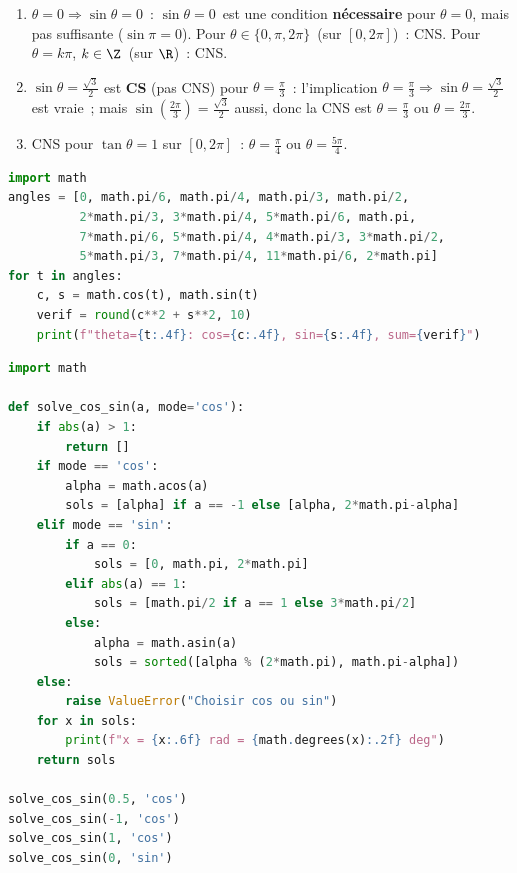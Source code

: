 \begin{enumerate}
  \item $\theta=0\Rightarrow\sin\theta=0$~: \og $\sin\theta=0$\fg\ est une condition \textbf{n\'ecessaire} pour $\theta=0$, mais pas suffisante ($\sin\pi=0$).
        Pour \og $\theta\in\{0,\pi,2\pi\}$\fg\ (sur $[0,2\pi]$)~: CNS. Pour \og $\theta=k\pi$, $k\in\Z$\fg\ (sur $\R$)~: CNS.
  \item $\sin\theta=\frac{\sqrt{3}}{2}$ est \textbf{CS} (pas CNS) pour $\theta=\frac{\pi}{3}$~:
        l'implication $\theta=\frac{\pi}{3}\Rightarrow\sin\theta=\frac{\sqrt{3}}{2}$ est vraie~;
        mais $\sin(\frac{2\pi}{3})=\frac{\sqrt{3}}{2}$ aussi, donc la CNS est $\theta=\frac{\pi}{3}$ ou $\theta=\frac{2\pi}{3}$.
  \item CNS pour $\tan\theta=1$ sur $[0,2\pi]$~: $\theta=\frac{\pi}{4}$ ou $\theta=\frac{5\pi}{4}$.
\end{enumerate}


\begin{lstlisting}[language=Python]
import math
angles = [0, math.pi/6, math.pi/4, math.pi/3, math.pi/2,
          2*math.pi/3, 3*math.pi/4, 5*math.pi/6, math.pi,
          7*math.pi/6, 5*math.pi/4, 4*math.pi/3, 3*math.pi/2,
          5*math.pi/3, 7*math.pi/4, 11*math.pi/6, 2*math.pi]
for t in angles:
    c, s = math.cos(t), math.sin(t)
    verif = round(c**2 + s**2, 10)
    print(f"theta={t:.4f}: cos={c:.4f}, sin={s:.4f}, sum={verif}")
\end{lstlisting}


\begin{lstlisting}[language=Python]
import math

def solve_cos_sin(a, mode='cos'):
    if abs(a) > 1:
        return []
    if mode == 'cos':
        alpha = math.acos(a)
        sols = [alpha] if a == -1 else [alpha, 2*math.pi-alpha]
    elif mode == 'sin':
        if a == 0:
            sols = [0, math.pi, 2*math.pi]
        elif abs(a) == 1:
            sols = [math.pi/2 if a == 1 else 3*math.pi/2]
        else:
            alpha = math.asin(a)
            sols = sorted([alpha % (2*math.pi), math.pi-alpha])
    else:
        raise ValueError("Choisir cos ou sin")
    for x in sols:
        print(f"x = {x:.6f} rad = {math.degrees(x):.2f} deg")
    return sols

solve_cos_sin(0.5, 'cos')
solve_cos_sin(-1, 'cos')
solve_cos_sin(1, 'cos')
solve_cos_sin(0, 'sin')
\end{lstlisting}

